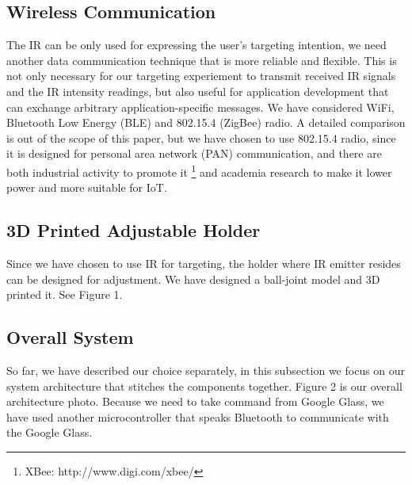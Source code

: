 \subsection{Wireless Communication}
\label{sec:wirel-comm}
The IR can be only used for expressing the user's targeting intention, we need another data communication technique that is more reliable and flexible. This is not only necessary for our targeting experiement to transmit received IR signals and the IR intensity readings, but also useful for application development that can exchange arbitrary application-specific messages. We have considered WiFi, Bluetooth Low Energy (BLE) and 802.15.4 (ZigBee) radio. A detailed comparison is out of the scope of this paper, but we have chosen to use 802.15.4 radio, since it is designed for personal area network (PAN) communication, and there are both industrial activity to promote it \footnote{XBee: http://www.digi.com/xbee/} and academia research \cite{watteyne2012openwsn} to make it lower power and more suitable for IoT.

\subsection{3D Printed Adjustable Holder}
\label{sec:3d-print-adjust}
Since we have chosen to use IR for targeting, the holder where IR emitter resides can be designed for adjustment. We have designed a ball-joint model and 3D printed it. See Figure 1.

\subsection{Overall System}
\label{sec:overall-system}
So far, we have described our choice separately, in this subsection we focus on our system architecture that stitches the components together. 
Figure 2 is our overall architecture photo. Because we need to take command from Google Glass, we have used another microcontroller that speaks Bluetooth to communicate with the Google Glass. 





